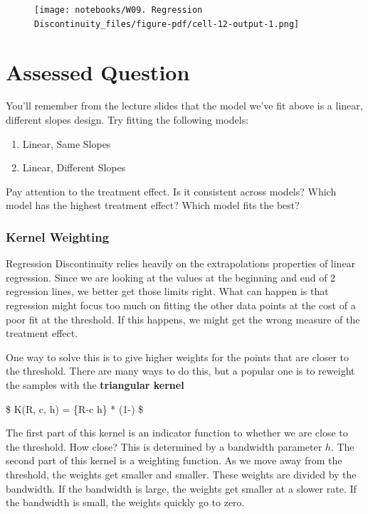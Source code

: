 \documentclass[
  letterpaper,
  DIV=11,
  numbers=noendperiod]{scrreprt}
\providecommand{\tightlist}{%
  \setlength{\itemsep}{0pt}\setlength{\parskip}{0pt}}\usepackage{longtable,booktabs,array}
\begin{document}
\begin{figure}[H]

{\centering \texttt{[image: notebooks/W09. Regression Discontinuity\_files/figure-pdf/cell-12-output-1.png]}

}

\end{figure}


\hypertarget{assessed-question-2}{%
\chapter{Assessed Question}\label{assessed-question-2}}

You'll remember from the lecture slides that the model we've fit above
is a linear, different slopes design. Try fitting the following models:

\begin{enumerate}
\def\labelenumi{\arabic{enumi}.}
\tightlist
\item
  Linear, Same Slopes
\item
  Linear, Different Slopes
\end{enumerate}

Pay attention to the treatment effect. Is it consistent across models?
Which model has the highest treatment effect? Which model fits the best?

\hypertarget{kernel-weighting}{%
\subsection{Kernel Weighting}\label{kernel-weighting}}

Regression Discontinuity relies heavily on the extrapolations properties
of linear regression. Since we are looking at the values at the
beginning and end of 2 regression lines, we better get those limits
right. What can happen is that regression might focus too much on
fitting the other data points at the cost of a poor fit at the
threshold. If this happens, we might get the wrong measure of the
treatment effect.

One way to solve this is to give higher weights for the points that are
closer to the threshold. There are many ways to do this, but a popular
one is to reweight the samples with the \textbf{triangular kernel}

\$ K(R, c, h) = \{\textbar R-c\textbar{} \leq h\} *
\bigg(1-\bigg) \$

The first part of this kernel is an indicator function to whether we are
close to the threshold. How close? This is determined by a bandwidth
parameter \(h\). The second part of this kernel is a weighting function.
As we move away from the threshold, the weights get smaller and smaller.
These weights are divided by the bandwidth. If the bandwidth is large,
the weights get smaller at a slower rate. If the bandwidth is small, the
weights quickly go to zero.
\end{document}
